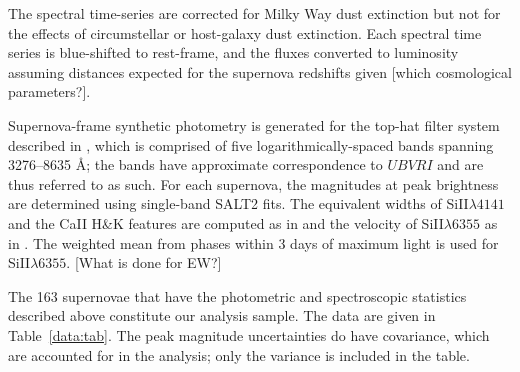 \documentclass{aastex}   	%
\begin{document}
The spectral time-series  are corrected for Milky Way dust
extinction \citep{1989ApJ...345..245C,1998ApJ...500..525S} but not for the
effects of circumstellar or host-galaxy dust extinction.  
Each spectral time series is
blue-shifted to rest-frame, and the fluxes converted to luminosity assuming
distances expected for the supernova redshifts given [which cosmological parameters?].

Supernova-frame synthetic photometry is generated for the top-hat filter system
described in \citet{2011A&A...529L...4C}, which is comprised of five logarithmically-spaced bands spanning
3276--8635 \AA; the bands have approximate correspondence to $UBVRI$ and are thus referred to as such.
For each supernova, the magnitudes at peak brightness are determined using single-band SALT2 fits.
The equivalent widths of SiII$\lambda 4141$ and the CaII H\&K features are computed as
in \citet{2008A&A...477..717B} and the velocity of SiII$\lambda 6355$ as in \citet{chotard:thesis}.
The weighted mean from phases within 3 days of maximum light is used for SiII$\lambda 6355$.
[What is done for EW?]

The 163 supernovae that have the photometric and spectroscopic statistics described above
constitute our analysis sample.  The data are given in Table~\ref{data:tab}.
The peak magnitude uncertainties do have covariance, which are accounted
for in the analysis; only the variance is included in the table.
\end{document}
